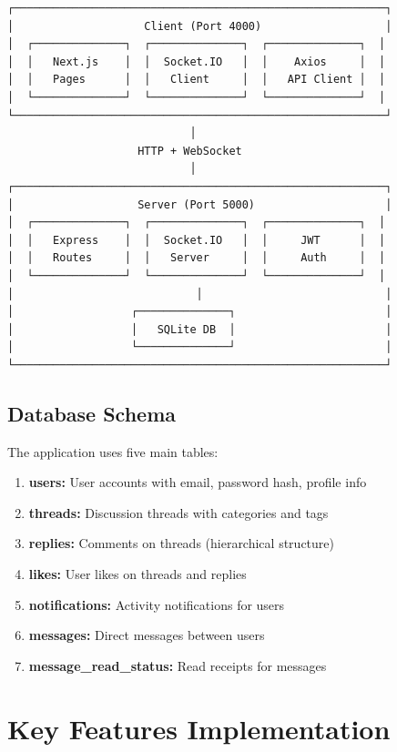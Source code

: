 \documentclass[11pt,a4paper]{article}
\begin{document}
\begin{verbatim}
┌─────────────────────────────────────────────────────────┐
│                    Client (Port 4000)                   │
│  ┌──────────────┐  ┌──────────────┐  ┌──────────────┐  │
│  │   Next.js    │  │  Socket.IO   │  │    Axios     │  │
│  │   Pages      │  │   Client     │  │   API Client │  │
│  └──────────────┘  └──────────────┘  └──────────────┘  │
└─────────────────────────────────────────────────────────┘
                            │
                    HTTP + WebSocket
                            │
┌─────────────────────────────────────────────────────────┐
│                   Server (Port 5000)                    │
│  ┌──────────────┐  ┌──────────────┐  ┌──────────────┐  │
│  │   Express    │  │  Socket.IO   │  │     JWT      │  │
│  │   Routes     │  │   Server     │  │     Auth     │  │
│  └──────────────┘  └──────────────┘  └──────────────┘  │
│                            │                            │
│                  ┌──────────────┐                       │
│                  │   SQLite DB  │                       │
│                  └──────────────┘                       │
└─────────────────────────────────────────────────────────┘
\end{verbatim}

\subsection{Database Schema}

The application uses five main tables:

\begin{enumerate}[leftmargin=*]
    \item \textbf{users:} User accounts with email, password hash, profile info
    \item \textbf{threads:} Discussion threads with categories and tags
    \item \textbf{replies:} Comments on threads (hierarchical structure)
    \item \textbf{likes:} User likes on threads and replies
    \item \textbf{notifications:} Activity notifications for users
    \item \textbf{messages:} Direct messages between users
    \item \textbf{message\_read\_status:} Read receipts for messages
\end{enumerate}

\section{Key Features Implementation}
\end{document}
